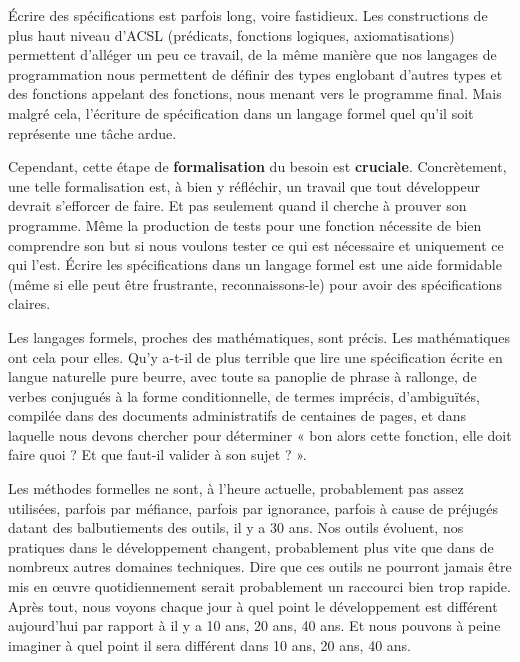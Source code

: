 Écrire des spécifications est parfois long, voire fastidieux. Les constructions
de plus haut niveau d'ACSL (prédicats, fonctions logiques, axiomatisations)
permettent d'alléger un peu ce travail, de la même manière que nos langages de
programmation nous permettent de définir des types englobant d'autres types et
des fonctions appelant des fonctions, nous menant vers le programme final. Mais
malgré cela, l'écriture de spécification dans un langage formel quel qu'il soit
représente une tâche ardue.



Cependant, cette étape de \textbf{formalisation} du besoin est \textbf{cruciale}.
Concrètement, une telle formalisation est, à bien y réfléchir, un travail que
tout développeur devrait s'efforcer de faire. Et pas seulement quand il cherche
à prouver son programme. Même la production de tests pour une fonction
nécessite de bien comprendre son but si nous voulons tester ce qui est nécessaire
et uniquement ce qui l'est. Écrire les spécifications dans un langage formel est
une aide formidable (même si elle peut être frustrante, reconnaissons-le) pour
avoir des spécifications claires.


Les langages formels, proches des mathématiques, sont précis. Les mathématiques
ont cela pour elles. Qu'y a-t-il de plus terrible que lire une spécification
écrite en langue naturelle pure beurre, avec toute sa panoplie de phrase à
rallonge, de verbes conjugués à la forme conditionnelle, de termes imprécis,
d'ambiguïtés, compilée dans des documents administratifs de centaines de pages,
et dans laquelle nous devons chercher pour déterminer « bon alors cette fonction,
elle doit faire quoi ? Et que faut-il valider à son sujet ? ».



Les méthodes formelles ne sont, à l'heure actuelle, probablement pas assez
utilisées, parfois par méfiance, parfois par ignorance, parfois à cause de
préjugés datant des balbutiements des outils, il y a 30 ans. Nos outils
évoluent, nos pratiques dans le développement changent, probablement plus
vite que dans de nombreux autres domaines techniques. Dire que ces outils
ne pourront jamais être mis en œuvre quotidiennement serait probablement un
raccourci bien trop rapide. Après tout, nous voyons chaque jour à quel point le
développement est différent aujourd'hui par rapport à il y a 10 ans, 20 ans,
40 ans. Et nous pouvons à peine imaginer à quel point il sera différent dans
10 ans, 20 ans, 40 ans.



